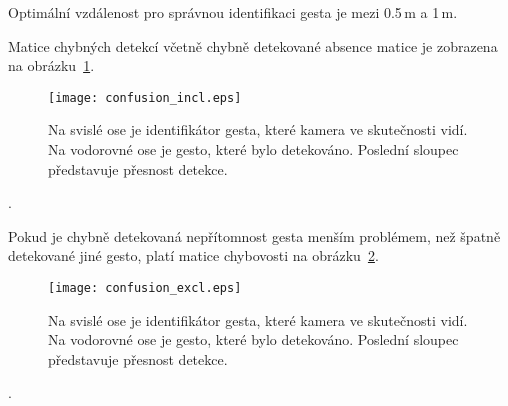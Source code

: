 Optimální vzdálenost pro správnou identifikaci gesta je mezi 0.5\,m a 1\,m.

Matice chybných detekcí včetně chybně detekované absence matice je zobrazena na obrázku~\ref{pic21}.
\begin{figure}[h]
\centering
\texttt{[image: confusion\_incl.eps]}
\caption{Na svislé ose je identifikátor gesta, které kamera ve skutečnosti vidí. Na vodorovné ose je gesto, které bylo detekováno. Poslední sloupec představuje přesnost detekce. }
\label{pic21}
\end{figure}.

Pokud je chybně detekovaná nepřítomnost gesta menším problémem, než špatně detekované jiné gesto, platí matice chybovosti na obrázku~\ref{pic22}.
\begin{figure}[htp]
\centering
\texttt{[image: confusion\_excl.eps]}
\caption{Na svislé ose je identifikátor gesta, které kamera ve skutečnosti vidí. Na vodorovné ose je gesto, které bylo detekováno. Poslední sloupec představuje přesnost detekce.}
\label{pic22}
\end{figure}.





\endinput